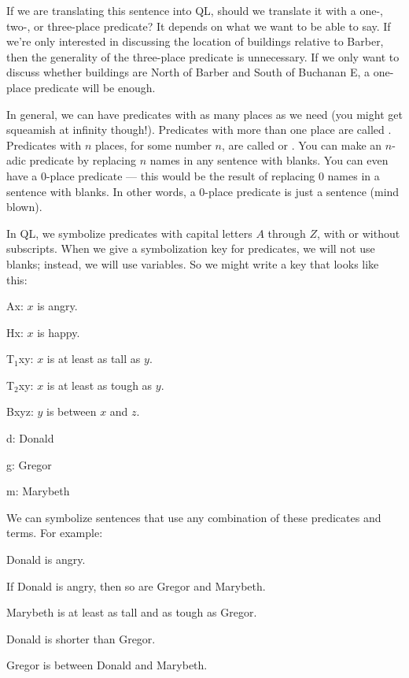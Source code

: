 If we are translating this sentence into QL, should we translate it with a one-, two-, or three-place predicate? It depends on what we want to be able to say. If we're only interested in discussing the location of buildings relative to Barber, then the generality of the three-place predicate is unnecessary. If we only want to discuss whether buildings are North of Barber and South of Buchanan E, a one-place predicate will be enough.

In general, we can have predicates with as many places as we need {\color{black}(you might get squeamish at infinity though!)}. Predicates with more than one place are called . Predicates with $n$ places, for some number $n$, are called  or . You can make an $n$-adic predicate by replacing $n$ names in any sentence with blanks. You can even have a 0-place predicate --- this would be the result of replacing $0$ names in a sentence with blanks. In other words, a 0-place predicate is just a sentence {\color{black} (mind blown)}.

In QL, we symbolize predicates with capital letters $A$ through $Z$, with or without subscripts. When we give a symbolization key for predicates, we will not use blanks; instead, we will use variables. So we might write a key that looks like this:
\begin{groupitems}
\begin{ekey}
\item[Ax:] $x$ is angry.
\item[Hx:] $x$ is happy.
\item[T$_1$xy:] $x$ is at least as tall as $y$.
\item[T$_2$xy:] $x$ is at least as tough as $y$.
\item[Bxyz:] $y$ is between $x$ and $z$.
\item[d:] Donald
\item[g:] Gregor
\item[m:] Marybeth
\end{ekey}
\end{groupitems}

We can symbolize sentences that use any combination of these predicates and terms. For example:
\begin{earg}
\item[\ex{terms1}] Donald is angry.
\item[\ex{terms2}] If Donald is angry, then so are Gregor and Marybeth.
\item[\ex{terms3}] Marybeth is at least as tall and as tough as Gregor.
\item[\ex{terms4}] Donald is shorter than Gregor.
\item[\ex{terms5}] Gregor is between Donald and Marybeth.
\end{earg}

